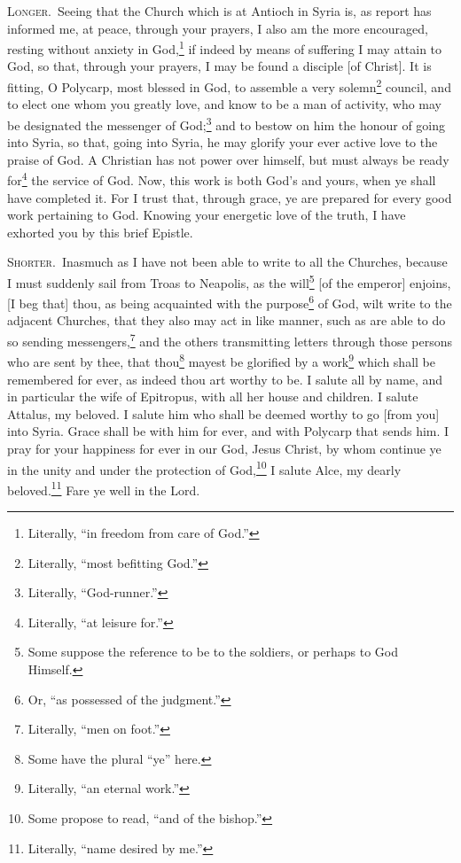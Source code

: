 \textsc{Longer.}~Seeing that the Church which is at Antioch in Syria is, as report has informed me, at peace, through your prayers, I also am the more encouraged, resting without anxiety in God,\footnote{Literally, “in freedom from care of God.”} if indeed by means of suffering I may attain to God, so that, through your prayers, I may be found a disciple [of Christ]. It is fitting, O Polycarp, most blessed in God, to assemble a very solemn\footnote{Literally, “most befitting God.”} council, and to elect one whom you greatly love, and know to be a man of activity, who may be designated the messenger of God;\footnote{Literally, “God-runner.”} and to bestow on him the honour of going into Syria, so that, going into Syria, he may glorify your ever active love to the praise of God. A Christian has not power over himself, but must always be ready for\footnote{Literally, “at leisure for.”} the service of God. Now, this work is both God’s and yours, when ye shall have completed it. For I trust that, through grace, ye are prepared for every good work pertaining to God. Knowing your energetic love of the truth, I have exhorted you by this brief Epistle.


\textsc{Shorter.}~Inasmuch as I have not been able to write to all the Churches, because I must suddenly sail from Troas to Neapolis, as the will\footnote{Some suppose the reference to be to the soldiers, or perhaps to God Himself.} [of the emperor] enjoins, [I beg that] thou, as being acquainted with the purpose\footnote{Or, “as possessed of the judgment.”} of God, wilt write to the adjacent Churches, that they also may act in like manner, such as are able to do so sending messengers,\footnote{Literally, “men on foot.”} and the others transmitting letters through those persons who are sent by thee, that thou\footnote{Some have the plural “ye” here.} mayest be glorified by a work\footnote{Literally, “an eternal work.”} which shall be remembered for ever, as indeed thou art worthy to be. I salute all by name, and in particular the wife of Epitropus, with all her house and children. I salute Attalus, my beloved. I salute him who shall be deemed worthy to go [from you] into Syria. Grace shall be with him for ever, and with Polycarp that sends him. I pray for your happiness for ever in our God, Jesus Christ, by whom continue ye in the unity and under the protection of God,\footnote{Some propose to read, “and of the bishop.”} I salute Alce, my dearly beloved.\footnote{Literally, “name desired by me.”} Fare ye well in the Lord.

